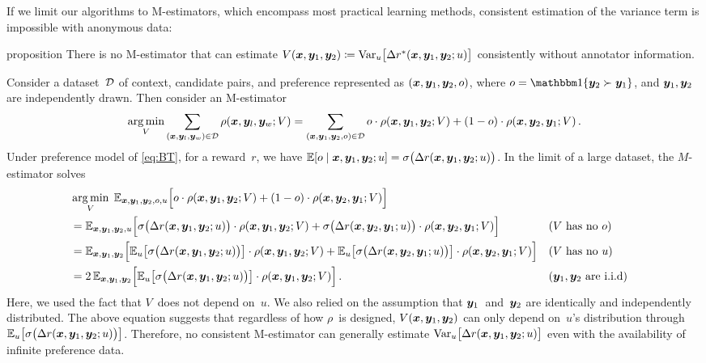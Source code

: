 If we limit our algorithms to M-estimators, which encompass most practical learning methods, consistent estimation of the variance term is impossible with anonymous data:
\begin{theoremEnd}[restate]{proposition}
\label{prop:no_estimator_of_var}
There is no M-estimator that can estimate $V({\bm{x}}, {\bm{y}}_1, {\bm{y}}_2) \coloneqq \mathrm{Var}_u\big[\Delta r^*({\bm{x}}, {\bm{y}}_1, {\bm{y}}_2; u)\big]$ consistently without annotator information.
\end{theoremEnd}
\begin{proofEnd}
    Consider a dataset~${\mathcal{D}}$ of context, candidate pairs, and preference represented as $({\bm{x}}, {\bm{y}}_1, {\bm{y}}_2, o)$, where $o = \One\{\vy_2 \succ \vy_1\}$, and ${\bm{y}}_1, {\bm{y}}_2$ are independently drawn. Then consider an M-estimator
    \begin{equation*}
        \operatorname*{arg\,min}_V \sum_{({\bm{x}}, {\bm{y}}_l, {\bm{y}}_w) \in {\mathcal{D}}} \rho({\bm{x}}, {\bm{y}}_l, {\bm{y}}_w; V)
        = \sum_{({\bm{x}}, {\bm{y}}_1, {\bm{y}}_2, o) \in {\mathcal{D}}} o \cdot \rho({\bm{x}}, {\bm{y}}_1, {\bm{y}}_2; V) + (1 - o) \cdot \rho({\bm{x}}, {\bm{y}}_2, {\bm{y}}_1; V)
        \,.
    \end{equation*}
    Under preference model of \cref{eq:BT}, for a reward~$r$, we have $\mathbb{E}[o \mid {\bm{x}}, {\bm{y}}_1, {\bm{y}}_2; u] = \sigma\big(\Delta r({\bm{x}}, {\bm{y}}_1, {\bm{y}}_2; u)\big)$. In the limit of a large dataset, the $M$-estimator solves
    \begin{align*}
        &\operatorname*{arg\,min}_V \;\mathbb{E}_{{\bm{x}}, {\bm{y}}_1, {\bm{y}}_2, o, u}\Big[ o \cdot \rho({\bm{x}}, {\bm{y}}_1, {\bm{y}}_2; V) + (1 - o) \cdot \rho({\bm{x}}, {\bm{y}}_2, {\bm{y}}_1; V)  \Big] \nonumber \\
        &= \mathbb{E}_{{\bm{x}}, {\bm{y}}_1, {\bm{y}}_2, u}\Big[
        \sigma\big(\Delta r({\bm{x}}, {\bm{y}}_1, {\bm{y}}_2; u)\big) \cdot \rho({\bm{x}}, {\bm{y}}_1, {\bm{y}}_2; V)
        + \sigma\big(\Delta r({\bm{x}}, {\bm{y}}_2, {\bm{y}}_1; u)\big) \cdot \rho({\bm{x}}, {\bm{y}}_2, {\bm{y}}_1; V)
        \Big] && \text{($V$ has no $o$)} \\
        &= \mathbb{E}_{{\bm{x}}, {\bm{y}}_1, {\bm{y}}_2}\Big[
        \mathbb{E}_u\big[\sigma\big(\Delta r({\bm{x}}, {\bm{y}}_1, {\bm{y}}_2; u)\big)\big] \cdot \rho({\bm{x}}, {\bm{y}}_1, {\bm{y}}_2; V)
        + \mathbb{E}_u\big[\sigma\big(\Delta r({\bm{x}}, {\bm{y}}_2, {\bm{y}}_1; u)\big)\big] \cdot \rho({\bm{x}}, {\bm{y}}_2, {\bm{y}}_1; V)
        \Big] && \text{($V$ has no $u$)} \\
        &= 2 \, \mathbb{E}_{{\bm{x}}, {\bm{y}}_1, {\bm{y}}_2}\Big[ \mathbb{E}_u\big[\sigma\big(\Delta r({\bm{x}}, {\bm{y}}_1, {\bm{y}}_2; u)\big)\big] \cdot \rho({\bm{x}}, {\bm{y}}_1, {\bm{y}}_2; V) \Big] \,. && \text{(${\bm{y}}_1, {\bm{y}}_2$ are i.i.d)}
    \end{align*}
    Here, we used the fact that $V$~does not depend on~$u$. We also relied on the assumption that ${\bm{y}}_1$~and~${\bm{y}}_2$ are identically and independently distributed. The above equation suggests that regardless of how $\rho$~is designed, $V({\bm{x}}, {\bm{y}}_1, {\bm{y}}_2)$ can only depend on~$u$'s distribution through $\mathbb{E}_u\big[\sigma\big(\Delta r({\bm{x}}, {\bm{y}}_1, {\bm{y}}_2; u)\big)\big]$. Therefore, no consistent M-estimator can generally estimate $\mathrm{Var}_u\big[\Delta r({\bm{x}}, {\bm{y}}_1, {\bm{y}}_2; u)\big]$ even with the availability of infinite preference data.   
\end{proofEnd}
